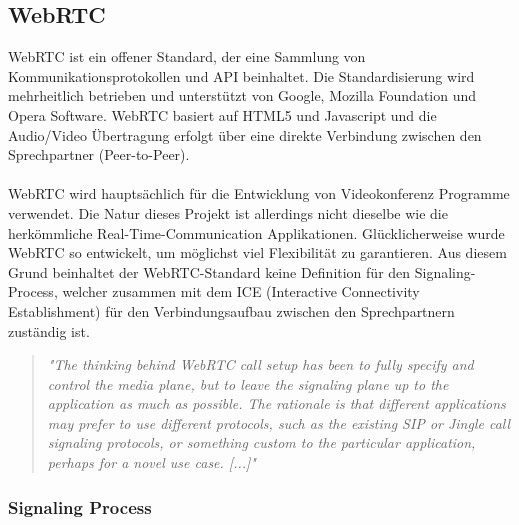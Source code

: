 \subsection{WebRTC}
\label{kap:webrtc}
WebRTC ist ein offener Standard, der eine Sammlung von Kommunikationsprotokollen und API beinhaltet. Die Standardisierung wird mehrheitlich betrieben und unterstützt von Google, Mozilla Foundation und Opera Software. WebRTC basiert auf HTML5 und Javascript und die Audio/Video Übertragung erfolgt über eine direkte Verbindung zwischen den Sprechpartner (Peer-to-Peer).
\\
\\
WebRTC wird hauptsächlich für die Entwicklung von Videokonferenz Programme verwendet. Die Natur dieses Projekt ist allerdings nicht dieselbe wie die herkömmliche Real-Time-Communication Applikationen. Glücklicherweise wurde WebRTC so entwickelt, um möglichst viel Flexibilität zu garantieren. Aus diesem Grund beinhaltet der WebRTC-Standard keine Definition für den Signaling-Process, welcher zusammen mit dem ICE (Interactive Connectivity Establishment) für den Verbindungsaufbau zwischen den Sprechpartnern zuständig ist. 

\begin{quote} 
	\textit{
		"The thinking behind WebRTC call setup has been to fully specify and control the media plane, but to leave the signaling plane up to the application as much as possible. The rationale is that different applications may prefer to use different protocols, such as the existing SIP or Jingle call signaling protocols, or something custom to the particular application, perhaps for a novel use case. [...]"
	} 
	\\
	\cite[Sam Dutton, HTML5Rocks.com]{001} 
\end{quote}

\subsubsection{Signaling Process}
\label{kap:signaling}

